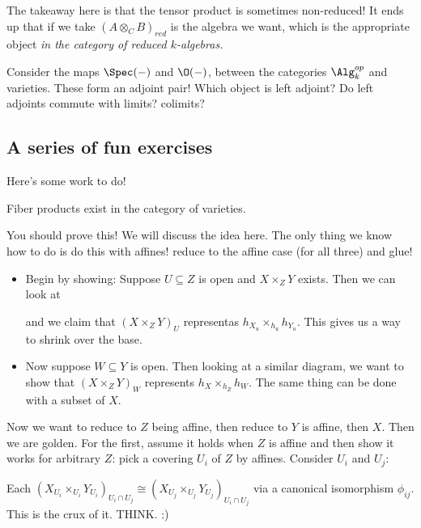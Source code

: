 \documentclass[12pt]{article}
\begin{document}
The takeaway here is that the tensor product is sometimes non-reduced! It ends up that if we take $(A\otimes_C B)_{red}$ is the algebra we want, which is the 
appropriate object \textit{in the category of reduced $k$-algebras.}
\begin{prob}
	Consider the maps $\Spec(-)$ and $\O(-)$, between the categories $\Alg_k^{op}$ and varieties. These form an adjoint pair! Which object is 
	left adjoint? Do left adjoints commute with limits? colimits?
\end{prob}

\subsection{A series of fun exercises}
Here's some work to do!
\begin{thm}
	Fiber products exist in the category of varieties.
\end{thm}
\begin{rmk}
	You should prove this! We will discuss the idea here. The only thing we know how to do is do this with affines! 
	reduce to the affine case (for all three) and glue!
	\begin{itemize}
		\item Begin by showing: Suppose $U\subseteq Z$ is open and $X\times_Z Y$ exists. Then we can look at 
		\begin{center}
		\end{center}
		and we claim that $(X\times_ZY)_U$ representas $h_{X_u}\times_{h_u}h_{Y_u}$. This gives us a way to shrink over the base.
		\item Now suppose $W\subseteq Y$ is open. Then looking at a similar diagram, we want to show that $(X\times_ZY)_W$ represents $h_X\times_{h_Z}h_W$. The same thing can be done with a subset of $X$.
	\end{itemize}
	Now we want to reduce to $Z$ being affine, then reduce to $Y$ is affine, then $X$. Then we are golden.
	For the first, assume it holds when $Z$ is affine and then show it works for arbitrary $Z$: pick a covering $U_i$ of $Z$ by affines. Consider $U_i$ and $U_j$:
	
	Each $(X_{U_i}\times_{U_i}Y_{U_i})_{U_i\cap U_j}\cong (X_{U_j}\times_{U_j}Y_{U_j})_{U_i\cap U_j}$ via a canonical isomorphism $\phi_{ij}$. This is the crux of it. THINK. :)
\end{rmk}
\end{document}
